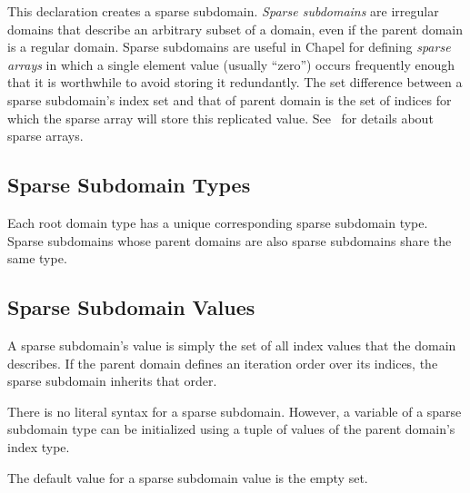 This declaration creates a sparse subdomain.
 \emph{Sparse subdomains} are irregular domains that describe an
arbitrary subset of a domain, even if the parent domain is a regular
domain.  Sparse subdomains are useful in Chapel for
defining \emph{sparse arrays} in which a single element value (usually ``zero'')
 occurs
frequently enough that it is worthwhile to avoid storing it
redundantly.  The set difference between a sparse subdomain's index set
and that of parent domain is the set of indices for which the
sparse array will store this replicated value.
See~ for details about sparse arrays.

\subsection{Sparse Subdomain Types}

Each root domain type has a unique corresponding sparse subdomain
type.  Sparse subdomains whose parent domains are also sparse
subdomains share the same type.

\subsection{Sparse Subdomain Values}
\label{Sparse_Domain_Values}

A sparse subdomain's value is simply the set of all index values that
the domain describes.  If the parent domain defines an iteration order
over its indices, the sparse subdomain inherits that order.

There is no literal syntax for a sparse subdomain.  However, a variable of a
sparse subdomain type can be initialized using a tuple of values
of the parent domain's index type.

The default value for a sparse subdomain value is the empty set.

